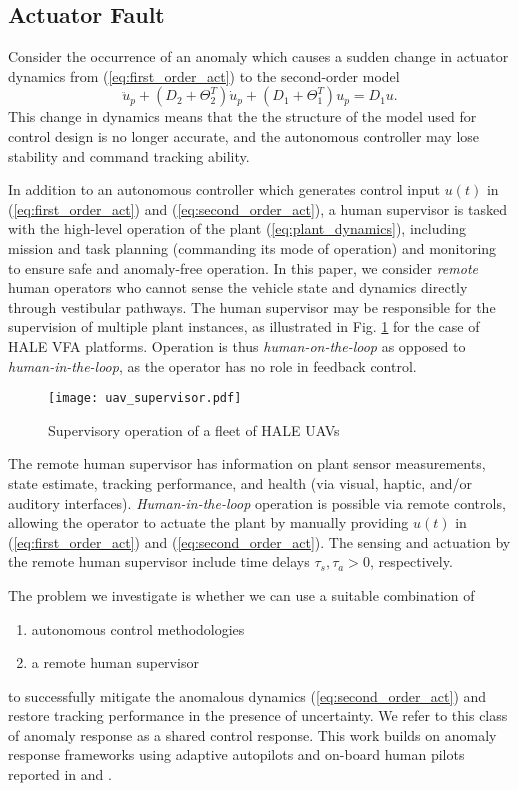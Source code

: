 \subsection{Actuator Fault}
Consider the occurrence of an anomaly which causes a sudden change in actuator dynamics from (\ref{eq:first_order_act}) to the second-order model
\begin{equation}
	\ddot{u}_p + (D_2 + \Theta_2^T) \dot{u}_p + (D_1 + \Theta_1^T) u_p = D_1 u. \label{eq:second_order_act}
\end{equation}
This change in dynamics means that the the structure of the model used for control design is no longer accurate, and the autonomous controller may lose stability and command tracking ability.

In addition to an autonomous controller which generates control input $u(t)$ in (\ref{eq:first_order_act}) and (\ref{eq:second_order_act}), a human supervisor is tasked with the high-level operation of the plant (\ref{eq:plant_dynamics}), including mission and task planning (commanding its mode of operation) and monitoring to ensure safe and anomaly-free operation. In this paper, we consider \textit{remote} human operators who cannot sense the vehicle state and dynamics directly through vestibular pathways. The human supervisor may be responsible for the supervision of multiple plant instances, as illustrated in Fig. \ref{fig:uav_supervisor} for the case of HALE VFA platforms. Operation is thus \textit{human-on-the-loop} as opposed to \textit{human-in-the-loop}, as the operator has no role in feedback control. 

\begin{figure}[htbp]
	\centering
	\texttt{[image: uav\_supervisor.pdf]}
	\caption{Supervisory operation of a fleet of HALE UAVs}
	\label{fig:uav_supervisor}
\end{figure}

The remote human supervisor has information on plant sensor measurements, state estimate, tracking performance, and health (via visual, haptic, and/or auditory interfaces). \textit{Human-in-the-loop} operation is possible via remote controls, allowing the operator to actuate the plant by manually providing $u(t)$ in (\ref{eq:first_order_act}) and (\ref{eq:second_order_act}). The sensing and actuation by the remote human supervisor include time delays $\tau_s, \tau_a > 0$, respectively.

The problem we investigate is whether we can use a suitable combination of 
\begin{enumerate}[label=(\alph*)]
	\item autonomous control methodologies
	\item a remote human supervisor
\end{enumerate}
  to successfully mitigate the anomalous dynamics (\ref{eq:second_order_act}) and restore tracking performance in the presence of uncertainty. We refer to this class of anomaly response as a shared control response. This work builds on anomaly response frameworks using adaptive autopilots and on-board human pilots reported in \cite{farjadian2017bumpless} and \cite{thomsen2018shared}.
